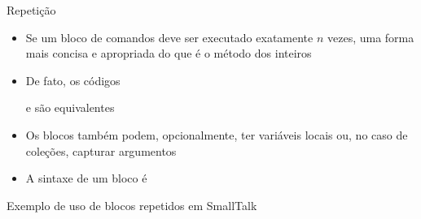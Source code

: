 \begin{frame}[fragile]{Repetição}

    \begin{itemize}
        \item Se um bloco de comandos deve ser executado exatamente $n$ vezes, uma forma mais
            concisa e apropriada do que   é o método 
             dos inteiros


        \item De fato, os códigos


        e
        são equivalentes

        \item Os blocos também podem, opcionalmente, ter variáveis locais ou, no caso de
            coleções, capturar argumentos 

        \item A sintaxe de um bloco é

    \end{itemize}

\end{frame}

\begin{frame}[fragile]{Exemplo de uso de blocos repetidos em SmallTalk}
\end{frame}
